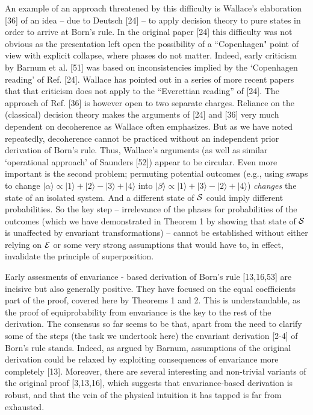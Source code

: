 \documentclass[aps,pra,epsfig,11pt,floatfix]{revtex4}
\begin{document}
An example of an approach threatened by this difficulty is Wallace's
elaboration [36] of an idea -- due to Deutsch [24] -- to apply decision
theory to pure states in order to arrive at Born's rule. In the original
paper [24] this difficulty was not obvious as the presentation left open the
possibility of a ``Copenhagen" point of view with explicit collapse, where
phases do not matter. Indeed, early criticism by Barnum et al. [51] was based
on inconsistencies implied by the `Copenhagen reading' of Ref. [24]. Wallace
has pointed out in a series of more recent papers that that criticism does not
apply to the ``Everettian reading'' of [24]. The approach of Ref. [36]
is however open to two separate charges. Reliance on the (classical) decision
theory makes the arguments of [24] and [36] very much dependent on decoherence
as Wallace often emphasizes. But as we have noted repeatedly, decoherence
cannot be practiced without an independent prior derivation of Born's rule.
Thus, Wallace's arguments (as well as similar `operational approach' of
Saunders [52]) appear to be circular. Even more important is the second
problem; permuting potential outcomes (e.g., using swaps to change
$|\alpha\rangle \propto |1\rangle +|2\rangle-|3\rangle+|4\rangle$ into
$|\beta\rangle \propto |1\rangle +|3\rangle-|2\rangle+|4\rangle$) {\it changes}
the state of an isolated system. And a different state of ${\cal S}$ could
imply different probabilities. So the key step -- irrelevance of the phases for
probabilities of the outcomes (which we have demonstrated in Theorem 1 by
showing that state of ${\cal S}$ is unaffected by envariant transformations)
-- cannot be established without either relying on ${\cal E}$ or some very
strong assumptions that would have to, in effect, invalidate the principle of
superposition.

Early assesments of envariance - based derivation of Born's rule [13,16,53]
are incisive but also generally positive. They have focused on 
the equal coefficients part of the proof, covered here by Theorems 1 and 2. 
This is understandable, as the proof of equiprobability from envariance
is  the key to the rest of the derivation. The consensus so far seems to be
that, apart from the need to clarify some of the steps (the task we undertook 
here) the envariant derivation [2-4] of Born's rule stands.
Indeed, as argued by Barnum, assumptions of the original derivation could be
relaxed by exploiting consequences of envariance more completely [13].
Moreover, there are several interesting and non-trivial variants of the original
proof [3,13,16], which suggests that envariance-based derivation is robust,
and that the vein of the physical intuition it has tapped is far from exhausted.
\end{document}
